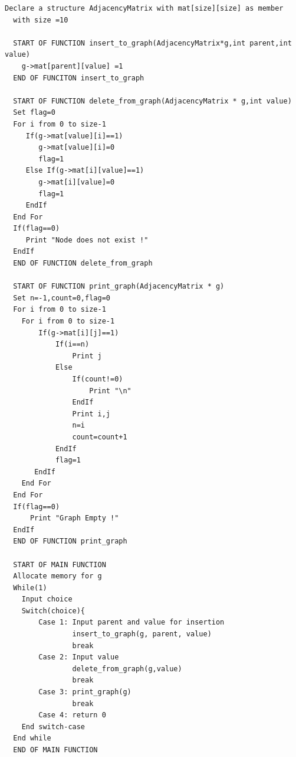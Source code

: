 \documentclass[14pt, letterpaper]{article}
\begin{document}
\begin{lstlisting}[label={list:first}]
  Declare a structure AdjacencyMatrix with mat[size][size] as member
  with size =10
  
  START OF FUNCTION insert_to_graph(AdjacencyMatrix*g,int parent,int value)
    g->mat[parent][value] =1
  END OF FUNCITON insert_to_graph
  
  START OF FUNCTION delete_from_graph(AdjacencyMatrix * g,int value)
  Set flag=0
  For i from 0 to size-1
     If(g->mat[value][i]==1)
        g->mat[value][i]=0
        flag=1
     Else If(g->mat[i][value]==1)
        g->mat[i][value]=0
        flag=1
     EndIf
  End For
  If(flag==0)
     Print "Node does not exist !"
  EndIf
  END OF FUNCTION delete_from_graph

  START OF FUNCTION print_graph(AdjacencyMatrix * g)
  Set n=-1,count=0,flag=0
  For i from 0 to size-1
    For i from 0 to size-1
        If(g->mat[i][j]==1)
            If(i==n)
                Print j
            Else
                If(count!=0)
                    Print "\n"
                EndIf
                Print i,j
                n=i
                count=count+1
            EndIf
            flag=1
       EndIf
    End For    
  End For
  If(flag==0)
      Print "Graph Empty !"
  EndIf
  END OF FUNCTION print_graph
  
  START OF MAIN FUNCTION
  Allocate memory for g
  While(1)
    Input choice
    Switch(choice){
        Case 1: Input parent and value for insertion 
                insert_to_graph(g, parent, value) 
                break
        Case 2: Input value                   
                delete_from_graph(g,value)
                break
        Case 3: print_graph(g)
                break
        Case 4: return 0
    End switch-case
  End while
  END OF MAIN FUNCTION 
\end{lstlisting}
\hline
\end{document}
